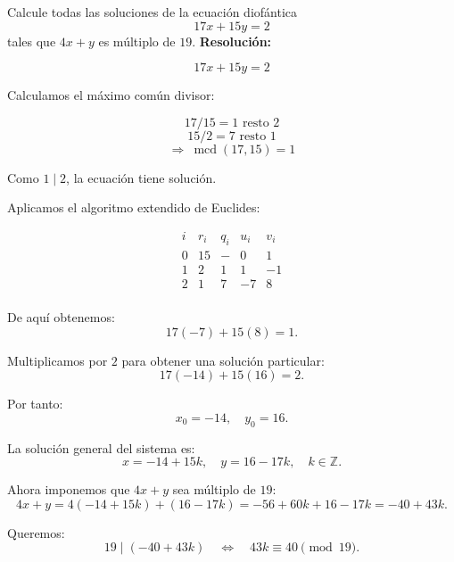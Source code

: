 \documentclass[a4paper,12pt]{article}
\begin{document}
\begin{ejercicio}[title=Ejercicio 35]
Calcule todas las soluciones de la ecuación diofántica
\[
17x + 15y = 2
\]
tales que $4x + y$ es múltiplo de $19$.
\tcblower
\textbf{Resolución:}

\[
17x + 15y = 2
\]

Calculamos el máximo común divisor:

\[
17 / 15 = 1 \text{ resto } 2
\]
\[
15 / 2 = 7 \text{ resto } \boxed{1}
\]
\[
\Rightarrow \ \operatorname{mcd}(17,15) = \boxed{1}
\]

Como $1 \mid 2$, la ecuación tiene solución.

\vspace{0.5em}

Aplicamos el algoritmo extendido de Euclides:

\[
\begin{array}{c|c|c|c|c}
i & r_i & q_i & u_i & v_i \\ \hline
0 & 15 & - & 0 & 1 \\
1 & 2 & 1 & 1 & -1 \\
2 & \boxed{1} & 7 & -7 & 8 \\
\end{array}
\]

De aquí obtenemos:
\[
17(-7) + 15(8) = 1.
\]

Multiplicamos por $2$ para obtener una solución particular:
\[
17(-14) + 15(16) = 2.
\]

Por tanto:
\[
x_0 = -14, \quad y_0 = 16.
\]

La solución general del sistema es:
\[
x = -14 + 15k, \quad y = 16 - 17k, \quad k \in \mathbb{Z}.
\]

\vspace{0.5em}

Ahora imponemos que $4x + y$ sea múltiplo de $19$:
\[
4x + y = 4(-14 + 15k) + (16 - 17k) = -56 + 60k + 16 - 17k = -40 + 43k.
\]

Queremos:
\[
19 \mid (-40 + 43k) \quad \Leftrightarrow \quad 43k \equiv 40 \pmod{19}.
\]

\end{ejercicio}
\end{document}
